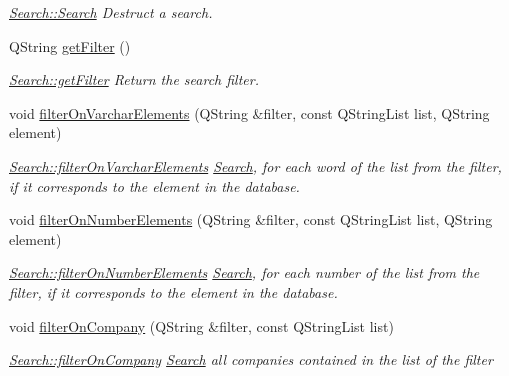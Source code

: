 \begin{DoxyCompactItemize}
\begin{DoxyCompactList}\small\item\em \hyperlink{classModels_1_1Search_a05ea0037161dce5dde6876afa384d71f}{Search\+::\+Search} Destruct a search. \end{DoxyCompactList}\item 
Q\+String \hyperlink{classModels_1_1Search_ab3ec88b48f6b404f8027dcbfce1495c6}{get\+Filter} ()
\begin{DoxyCompactList}\small\item\em \hyperlink{classModels_1_1Search_ab3ec88b48f6b404f8027dcbfce1495c6}{Search\+::get\+Filter} Return the search filter. \end{DoxyCompactList}\item 
void \hyperlink{classModels_1_1Search_a63afd22af898b54b405be45a8a1ff843}{filter\+On\+Varchar\+Elements} (Q\+String \&filter, const Q\+String\+List list, Q\+String element)
\begin{DoxyCompactList}\small\item\em \hyperlink{classModels_1_1Search_a63afd22af898b54b405be45a8a1ff843}{Search\+::filter\+On\+Varchar\+Elements} \hyperlink{classModels_1_1Search}{Search}, for each word of the {\itshape list} from the {\itshape filter}, if it corresponds to the {\itshape element} in the database. \end{DoxyCompactList}\item 
void \hyperlink{classModels_1_1Search_ab7c6fc3cf9062848c118ab7e8380726c}{filter\+On\+Number\+Elements} (Q\+String \&filter, const Q\+String\+List list, Q\+String element)
\begin{DoxyCompactList}\small\item\em \hyperlink{classModels_1_1Search_ab7c6fc3cf9062848c118ab7e8380726c}{Search\+::filter\+On\+Number\+Elements} \hyperlink{classModels_1_1Search}{Search}, for each number of the {\itshape list} from the {\itshape filter}, if it corresponds to the {\itshape element} in the database. \end{DoxyCompactList}\item 
void \hyperlink{classModels_1_1Search_af5e7f802c53a735915193fd596d45f07}{filter\+On\+Company} (Q\+String \&filter, const Q\+String\+List list)
\begin{DoxyCompactList}\small\item\em \hyperlink{classModels_1_1Search_af5e7f802c53a735915193fd596d45f07}{Search\+::filter\+On\+Company} \hyperlink{classModels_1_1Search}{Search} all companies contained in the {\itshape list} of the {\itshape filter} \end{DoxyCompactList}\item 

\end{DoxyCompactItemize}
